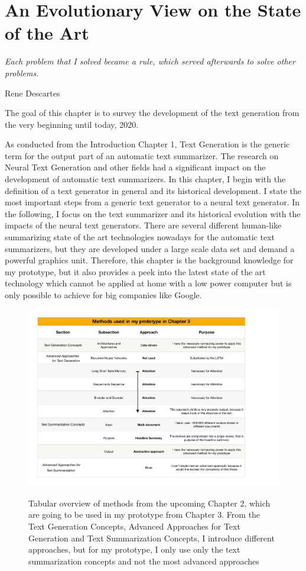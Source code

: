 \chapter{An Evolutionary View on the State of the Art}\label{ch:sota}

\epigraph{\textit{Each problem that I solved became a rule, which served afterwards to solve other problems.}}{Rene Descartes}

The goal of this chapter is to survey the development of the text generation from the very beginning until today, 2020. 

As conducted from the Introduction Chapter 1, Text Generation is the generic term for the output part of an automatic text summarizer. The research on Neural Text Generation and other fields had a significant impact on the development of automatic text summarizers. In this chapter, I begin with the definition of a text generator in general and its historical development. I state the most important steps from a generic text generator to a neural text generator. In the following, I focus on the text summarizer and its historical evolution with the impacts of the neural text generators. There are several different human-like summarizing state of the art technologies nowadays for the automatic text summarizers, but they are developed under a large scale data set and demand a powerful graphics unit. Therefore, this chapter is the background knowledge for my prototype, but it also provides a peek into the latest state of the art technology which cannot be applied at home with a low power computer but is only possible to achieve for big companies like Google.


\begin{figure}
	\begin{center}
		\includegraphics[width=6.5in]{photos/used_methods.pdf}\\
		\caption{Tabular overview of methods from the upcoming Chapter 2, which are going to be used in my prototype from Chapter 3. From the Text Generation Concepts, Advanced Approaches for Text Generation and Text Summarization Concepts, I introduce different approaches, but for my prototype, I only use only the text summarization concepts and not the most advanced approaches}\label{used_methods}
	\end{center}
\end{figure}

